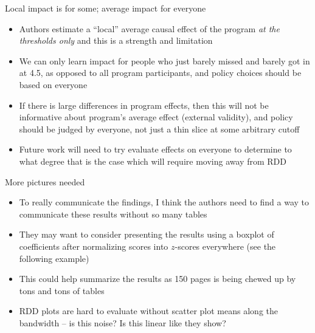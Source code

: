 \documentclass{beamer}
\begin{document}
\begin{frame}{Local impact is for some; average impact for everyone}

\begin{itemize}
\item Authors estimate a ``local'' average causal effect of the program \emph{at the thresholds only} and this is a strength and limitation
\item We can only learn impact for people who just barely missed and barely got in at 4.5, as opposed to all program participants, and policy choices should be based on everyone
\item If there is large differences in program effects, then this will not be informative about program's average effect (external validity), and policy should be judged by everyone, not just a thin slice at some arbitrary cutoff
\item Future work will need to try evaluate effects on everyone to determine to what degree that is the case which will require moving away from RDD 
\end{itemize}

\end{frame}


\begin{frame}{More pictures needed}

\begin{itemize}
\item To really communicate the findings, I think the authors need to find a way to communicate these results without so many tables
\item They may want to consider presenting the results using a boxplot of coefficients after normalizing scores into $z$-scores everywhere (see the following example)
\item This could help summarize the results as 150 pages is being chewed up by tons and tons of tables
\item RDD plots are hard to evaluate without scatter plot means along the bandwidth -- is this noise? Is this linear like they show?

\end{itemize}

\end{frame}
\end{document}
